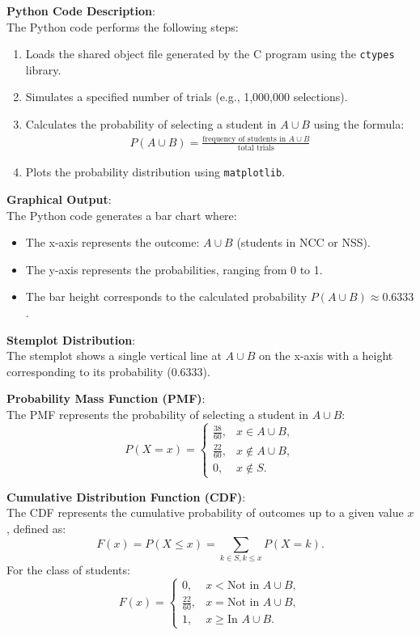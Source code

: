 \documentclass[journal]{IEEEtran}
\begin{document}
\textbf{Python Code Description}:\\
The Python code performs the following steps:
\begin{enumerate}
    \item Loads the shared object file generated by the C program using the \texttt{ctypes} library.
    \item Simulates a specified number of trials (e.g., 1,000,000 selections).
    \item Calculates the probability of selecting a student in $A \cup B$ using the formula:
    \begin{align}
        P(A \cup B) = \frac{\text{frequency of students in } A \cup B}{\text{total trials}}
    \end{align}
    \item Plots the probability distribution using \texttt{matplotlib}.
\end{enumerate}

\textbf{Graphical Output}:\\
The Python code generates a bar chart where:
\begin{itemize}
    \item The x-axis represents the outcome: $A \cup B$ (students in NCC or NSS).
    \item The y-axis represents the probabilities, ranging from 0 to 1.
    \item The bar height corresponds to the calculated probability $P(A \cup B) \approx 0.6333$.
\end{itemize}

\textbf{Stemplot Distribution}:\\
The stemplot shows a single vertical line at $A \cup B$ on the x-axis with a height corresponding to its probability (0.6333).

\textbf{Probability Mass Function (PMF)}:\\
The PMF represents the probability of selecting a student in $A \cup B$:
\[
P(X = x) = 
\begin{cases} 
\frac{38}{60}, & x \in A \cup B, \\ 
\frac{22}{60}, & x \notin A \cup B, \\ 
0, & x \notin S.
\end{cases}
\]

\textbf{Cumulative Distribution Function (CDF)}:\\
The CDF represents the cumulative probability of outcomes up to a given value $x$, defined as:
\[
F(x) = P(X \leq x) = \sum_{k \in S, k \leq x} P(X = k).
\]
For the class of students:
\[
F(x) = 
\begin{cases} 
0, & x < \text{Not in } A \cup B, \\ 
\frac{22}{60}, & x = \text{Not in } A \cup B, \\ 
1, & x \geq \text{In } A \cup B.
\end{cases}
\]
\end{document}
